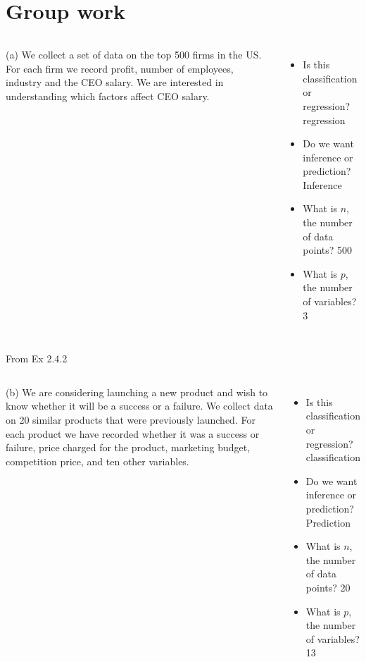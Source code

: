 \documentclass[aspectratio=169,usenames,dvipsnames]{beamer}
\newcommand{\InstructorNotes}[1]{{\color{orange}#1}}
\newcommand{\bvfill}{\vskip0pt plus 1filll}
\begin{document}
\section{Group work}
{
\begin{frame}
\begin{columns}
(a) We collect a set of data on the top 500 firms in the US. For each
firm we record profit, number of employees, industry and the
CEO salary. We are interested in understanding which factors
aﬀect CEO salary.

\begin{itemize}
	\item Is this classification or regression? 
	\InstructorNotes{regression}
	\item Do we want inference or prediction?
	\InstructorNotes{Inference}
	\item What is $n$, the number of data points?
	\InstructorNotes{500}
	\item What is $p$, the number of variables?
	\InstructorNotes{3}
\end{itemize}
\end{columns}

	\InstructorNotes{From Ex 2.4.2}
\end{frame}

\begin{frame}
\begin{columns}
(b) We are considering launching a new product and wish to know
whether it will be a success or a failure. We collect data on 20
similar products that were previously launched. For each product we have recorded whether it was a success or failure, price
charged for the product, marketing budget, competition price,
and ten other variables.
\begin{itemize}
	\item Is this classification or regression?
	\InstructorNotes{classification}
	\item Do we want inference or prediction?
	\InstructorNotes{Prediction}
	\item What is $n$, the number of data points?
	\InstructorNotes{20}
	\item What is $p$, the number of variables?
	\InstructorNotes{13}
\end{itemize}
\end{columns}

\end{frame}
}
\end{document}
